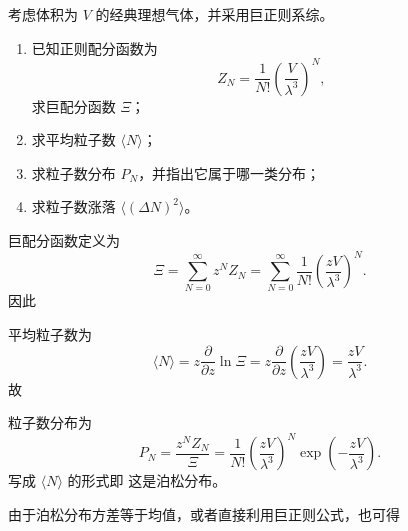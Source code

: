 \begin{question}
考虑体积为 $V$ 的经典理想气体，并采用巨正则系综。

\begin{enumerate}[label=(\arabic*),leftmargin=2.5em]
  \item 已知正则配分函数为
  \[
  Z_N=\frac{1}{N!}\left(\frac{V}{\lambda^3}\right)^N,
  \]
  求巨配分函数 $\Xi$；
  \item 求平均粒子数 $\langle N\rangle$；
  \item 求粒子数分布 $P_N$，并指出它属于哪一类分布；
  \item 求粒子数涨落 $\langle(\Delta N)^2\rangle$。
\end{enumerate}

\begin{solution}
巨配分函数定义为
\[
\Xi=\sum_{N=0}^{\infty} z^N Z_N
=\sum_{N=0}^{\infty}\frac{1}{N!}\left(\frac{zV}{\lambda^3}\right)^N.
\]
因此

平均粒子数为
\[
\langle N\rangle
=z\frac{\partial}{\partial z}\ln\Xi
=z\frac{\partial}{\partial z}\left(\frac{zV}{\lambda^3}\right)
=\frac{zV}{\lambda^3}.
\]
故

粒子数分布为
\[
P_N=\frac{z^N Z_N}{\Xi}
=
\frac{1}{N!}\left(\frac{zV}{\lambda^3}\right)^N
\exp\!\left(-\frac{zV}{\lambda^3}\right).
\]
写成 $\langle N\rangle$ 的形式即
这是泊松分布。

由于泊松分布方差等于均值，或者直接利用巨正则公式，也可得
\end{solution}
\end{question}
